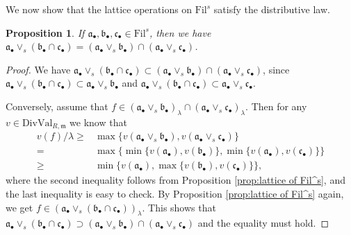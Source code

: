 \documentclass[11pt, leqno]{amsart}%
\theoremstyle{plain}
\newtheorem{proposition}[theorem]{Proposition}
\theoremstyle{definition}
\theoremstyle{remark}
\newcommand{\fa}{\mathfrak{a}}
\newcommand{\fb}{\mathfrak{b}}
\newcommand{\fc}{\mathfrak{c}}
\newcommand{\fm}{\mathfrak{m}}
\newcommand{\DivVal}{\mathrm{DivVal}}
\newcommand{\Fil}{\mathrm{Fil}}
\numberwithin{equation}{section}
\begin{document}
We now show that the lattice operations on $\Fil^s$ satisfy the distributive law.


\begin{proposition}\label{prop:distributivity}
    If $\fa_\bullet,\fb_\bullet,\fc_\bullet\in\Fil^s$, then we have
    $\fa_\bullet\vee_s(\fb_\bullet\cap\fc_\bullet)=(\fa_\bullet\vee_s\fb_\bullet)\cap(\fa_\bullet\vee_s\fc_\bullet)$.
\end{proposition}

\begin{proof}
    We have $\fa_\bullet\vee_s(\fb_\bullet\cap\fc_\bullet)\subset(\fa_\bullet\vee_s\fb_\bullet)\cap(\fa_\bullet\vee_s\fc_\bullet)$, since $\fa_\bullet\vee_s(\fb_\bullet\cap\fc_\bullet)\subset\fa_\bullet\vee_s\fb_\bullet$ and $\fa_\bullet\vee_s(\fb_\bullet\cap\fc_\bullet)\subset\fa_\bullet\vee_s\fc_\bullet$.
	
    Conversely, assume that $f\in (\fa_\bullet\vee_s\fb_\bullet)_\lambda\cap (\fa_\bullet\vee_s\fc_\bullet)_\lambda$. Then for any $v\in\DivVal_{R,\fm}$ we know that
    \begin{align*}
        v(f)/\lambda\ge &\max\{v(\fa_\bullet\vee_s\fb_\bullet), v(\fa_\bullet\vee_s\fc_\bullet)\}\\
        =&\max\{\min\{v(\fa_\bullet),v(\fb_\bullet)\},\min\{v(\fa_\bullet),v(\fc_\bullet)\}\}\\
        \ge&\min\{v(\fa_\bullet),\max\{v(\fb_\bullet),v(\fc_\bullet)\}\},
    \end{align*}
    where the second inequality follows from Proposition \ref{prop:lattice of Fil^s}, and the last inequality is easy to check. By Proposition \ref{prop:lattice of Fil^s} again, we get $f\in(\fa_\bullet\vee_s(\fb_\bullet\cap\fc_\bullet))_\lambda$. This shows that $\fa_\bullet\vee_s(\fb_\bullet\cap\fc_\bullet)\supset(\fa_\bullet\vee_s\fb_\bullet)\cap(\fa_\bullet\vee_s\fc_\bullet)$ and the equality must hold.
\end{proof}
\end{document}

